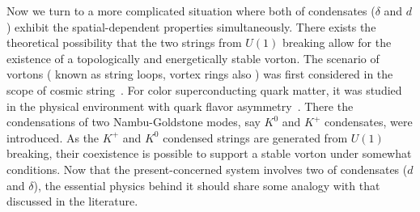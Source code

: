 \documentclass[12pt]{article}
\begin{document}
Now we turn to a more complicated situation where both of condensates ($\delta$ and $d$ ) exhibit the
spatial-dependent properties simultaneously. 
There exists the theoretical possibility that the two strings from $U(1)$ breaking allow for the existence of 
a topologically and energetically stable vorton. The scenario of vortons ( known as string loops, vortex rings also ) was first considered in the scope of cosmic string~\cite{vilenkin2000cosmic,witten1985superconducting,davis1988physics1,davis1988physics2,haws1988superconducting}.
For color superconducting quark matter, it was studied in the physical environment with quark flavor asymmetry~\cite{kaplan2002charged,buckley2002superconducting}. There the condensations of two Nambu-Goldstone modes, say $K^0$ and $K^+$ condensates, were introduced. As the $K^+$ and $K^0$ condensed strings are generated from $U(1)$ breaking,  
their coexistence is possible to support a stable vorton under somewhat conditions.
Now that the present-concerned system involves two of condensates ($d$ and $\delta$), 
the essential physics behind it should share some analogy with that discussed in the literature.
%
\end{document}
